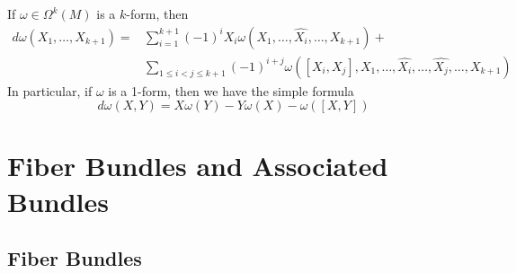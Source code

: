  If $\omega \in \Omega^k(M)$ is a $k$-form, then
\begin{align*}
	d\omega(X_1,\ldots,X_{k+1}) =& \sum_{i=1}^{k+1} (-1)^i X_i \omega(X_1,\ldots,\widehat{X_i},\ldots,X_{k+1}) + \\
	                             & \sum_{1 \leq i < j \leq k+1} (-1)^{i+j} \omega([X_i,X_j],X_1,\ldots,\widehat{X_i},\ldots,\widehat{X_j},\ldots,X_{k+1})
\end{align*}
In particular, if $\omega$ is a 1-form, then we have the simple formula
\begin{equation}
\label{simple formula for d of 1-form}
d\omega(X,Y) = X\omega(Y) - Y\omega(X) - \omega([X,Y])
\end{equation}












\section{Fiber Bundles and Associated Bundles}
\label{Fiber Bundles and Associated Bundles}


\subsection{Fiber Bundles}


